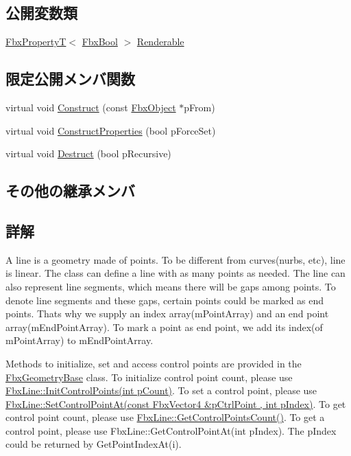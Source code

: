 \subsection*{公開変数類}
\begin{DoxyCompactItemize}
\item 
\hyperlink{class_fbx_property_t}{Fbx\+PropertyT}$<$ \hyperlink{fbxtypes_8h_a92e0562b2fe33e76a242f498b362262e}{Fbx\+Bool} $>$ \hyperlink{class_fbx_line_ab030d081f8127e48e92654e38fe2328e}{Renderable}
\end{DoxyCompactItemize}
\subsection*{限定公開メンバ関数}
\begin{DoxyCompactItemize}
\item 
virtual void \hyperlink{class_fbx_line_a42d7e3fb4684712df04464644abee11a}{Construct} (const \hyperlink{class_fbx_object}{Fbx\+Object} $\ast$p\+From)
\item 
virtual void \hyperlink{class_fbx_line_a48df4b6cd889814d3fe7ca5bb09bcc78}{Construct\+Properties} (bool p\+Force\+Set)
\item 
virtual void \hyperlink{class_fbx_line_a92abd64f6b58057c899bf5733a2e2275}{Destruct} (bool p\+Recursive)
\end{DoxyCompactItemize}
\subsection*{その他の継承メンバ}


\subsection{詳解}
A line is a geometry made of points. To be different from curves(nurbs, etc), line is linear. The class can define a line with as many points as needed. The line can also represent line segments, which means there will be gaps among points. To denote line segments and these gaps, certain points could be marked as end points. That\textquotesingle{}s why we supply an index array(m\+Point\+Array) and an end point array(m\+End\+Point\+Array). To mark a point as end point, we add its index(of m\+Point\+Array) to m\+End\+Point\+Array.

Methods to initialize, set and access control points are provided in the \hyperlink{class_fbx_geometry_base}{Fbx\+Geometry\+Base} class. To initialize control point count, please use \hyperlink{class_fbx_geometry_base_a471b736f2595c006a338c07a61907127}{Fbx\+Line\+::\+Init\+Control\+Points(int p\+Count)}. To set a control point, please use \hyperlink{class_fbx_geometry_base_ab2d5567b073e6b9f4feb5bb428fa99e4}{Fbx\+Line\+::\+Set\+Control\+Point\+At(const Fbx\+Vector4 \&p\+Ctrl\+Point , int p\+Index)}. To get control point count, please use \hyperlink{class_fbx_geometry_base_aa9f42ae6a958036722670143fabf3b17}{Fbx\+Line\+::\+Get\+Control\+Points\+Count()}. To get a control point, please use Fbx\+Line\+::\+Get\+Control\+Point\+At(int p\+Index). The p\+Index could be returned by Get\+Point\+Index\+At(i). 

